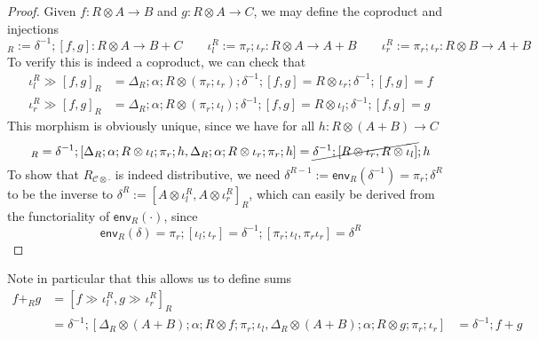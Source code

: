 \documentclass[acmsmall,screen,review]{acmart}
\newcommand{\mc}[1]{\ensuremath{\mathcal{#1}}}
\newcommand{\ms}[1]{\ensuremath{\mathsf{#1}}}
\newcommand{\dmor}[1]{{\Delta}_{#1}}
\newcommand{\envcom}[2]{{#1}_{#2 \otimes \cdot}}
\newcommand{\rseq}[3]{#2 \gg_{#1} #3}
\newcommand{\toenv}[2]{\ms{env}_{#1}(#2)}
\newcommand{\envcop}[3]{[#2, #3]_{#1}}
\newcommand{\envinr}[1]{\iota^{#1}_{r}}
\newcommand{\envinl}[1]{\iota^{#1}_{l}}
\begin{document}
\begin{proof}
  Given $f : R \otimes A \to B$ and $g : R \otimes A \to C$, we may define the coproduct and
  injections
  \begin{equation}
    \envcop{R}{f}{g} := \delta^{-1} ; [f, g] : R \otimes A \to B + C \qquad
    \envinl{R} := \pi_r ; \iota_r : R \otimes A \to A + B \qquad
    \envinr{R} := \pi_r ; \iota_r : R \otimes B \to A + B
  \end{equation}
  To verify this is indeed a coproduct, we can check that
  \begin{equation}
    \begin{aligned}
    \rseq{}{\envinl{R}}{\envcop{R}{f}{g}} 
      &= \dmor{R} ; \alpha ; R \otimes (\pi_r ; \iota_r) ; \delta^{-1} ; [f, g]
      = R \otimes \iota_r ; \delta^{-1} ; [f, g]
      = f \\
    \rseq{}{\envinr{R}}{\envcop{R}{f}{g}} 
    &= \dmor{R} ; \alpha ; R \otimes (\pi_r ; \iota_l) ; \delta^{-1} ; [f, g]
    = R \otimes \iota_l ; \delta^{-1} ; [f, g]
    = g
    \end{aligned}
  \end{equation}
  This morphism is obviously unique, since we have for all $h : R \otimes (A + B) \to C$
  \begin{equation}
    \envcop{R}{\rseq{}{\envinl{R}}{h}}{\rseq{}{\envinr{R}}{h}}
    = \delta^{-1} 
    ; [\dmor{R} ; \alpha ; R \otimes \iota_l ; \pi_r ; h,
      \dmor{R} ; \alpha ; R \otimes \iota_r ; \pi_r ; h]
    = \cancel{\delta^{-1} ; [R \otimes \iota_r, R \otimes \iota_l]} ; h
  \end{equation}
  To show that $\envcom{R}{\mc{C}}$ is indeed distributive, we need $\delta^{R-1} :=
  \toenv{R}{\delta^{-1}} = \pi_r ; \delta^R$ to be the inverse to $\delta^R := \envcop{R}{A \otimes
  \envinl{R}}{A \otimes \envinr{R}}$, which can easily be derived from the functoriality of
  $\toenv{R}{\cdot}$, since
  \begin{equation}
    \toenv{R}{\delta} = \pi_r ; [\iota_l ; \iota_r] 
                      = \delta^{-1} ; [\pi_r ; \iota_l, \pi_r \iota_r]
                      = \delta^R
  \end{equation}
\end{proof}
Note in particular that this allows us to define sums
\begin{equation}
  \begin{aligned}
    f +_R g 
    & = \envcop{R}{\rseq{}{f}{\envinl{R}}}{\rseq{}{g}{\envinr{R}}} \\
    & = \delta^{-1} ; [
      \dmor{R} \otimes (A + B) ; \alpha ; R \otimes f ; \pi_r ; \iota_l,
      \dmor{R} \otimes (A + B) ; \alpha ; R \otimes g ; \pi_r ; \iota_r
    ]
    & = \delta^{-1} ; f + g
  \end{aligned}
\end{equation}
\end{document}
